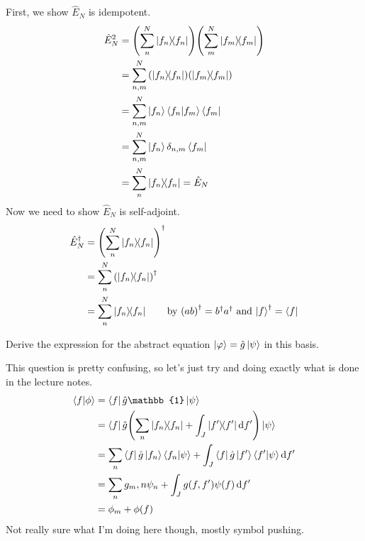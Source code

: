 \documentclass[boxes,pages]{homework}
\makeatletter
\newcommand{\herm}[1]{{{#1}^\dagger}}
\numberwithin{@problem}{section}
\makeatother
\begin{document}
\begin{solution}
	First, we show $\hat{E}_N$ is idempotent.
	\begin{align*}
		\hat{E}_N^2 & = \qty(\sum_n^N\ketbra{f_n}{f_n})\qty(\sum_m^N\ketbra{f_m}{f_m}) \\
		            & = \sum_{n, m}^N\qty(\ketbra{f_n}{f_n})\qty(\ketbra{f_m}{f_m})    \\
		            & = \sum_{n, m}^N\ket{f_n}\braket{f_n}{f_m}\bra{f_m}               \\
		            & = \sum_{n, m}^N\ket{f_n}\delta_{n,m}\bra{f_m}                    \\
		            & = \sum_n^N\ketbra{f_n}{f_n} = \hat{E}_N
	\end{align*}
	Now we need to show $\hat{E}_N$ is self-adjoint.
	\begin{align*}
		\herm{\hat{E}_N} & = \herm{\qty(\sum_n^N\ketbra{f_n}{f_n})}                                                                  \\
		                 & = \sum_n^N\herm{\qty(\ketbra{f_n}{f_n})}                                                                  \\
		                 & = \sum_n^N\ketbra{f_n}{f_n} \tag*{by $\herm{\qty(ab)} = \herm{b}\herm{a}$ and $\herm{\ket{f}} = \bra{f}$}
	\end{align*}
\end{solution}

\begin{problem}
Derive the expression for the abstract equation $\ket{\varphi} = \hat{g}\ket{\psi}$ in this basis.
\end{problem}

\begin{solution}
	This question is pretty confusing, so let's just try and doing exactly what is done in the lecture notes.
	\begin{align*}
		\braket{f}{\phi} & = \bra{f}\hat{g}\mathbb{1}\ket{\psi}                                                                     \\
		                 & = \bra{f}\hat{g}\qty(\sum_n\ketbra{f_n}{f_n} + \int_J\ketbra{f'}{f'}\dd{f'})\ket{\psi}                   \\
		                 & = \sum_n\bra{f}\hat{g}\ket{f_n}\braket{f_n}{\psi} + \int_J\bra{f}\hat{g}\ket{f'}\braket{f'}{\psi}\dd{f'} \\
		                 & = \sum_n g_m,n\psi_n + \int_J g(f, f')\psi(f)\dd{f'}                                                     \\
		                 & = \phi_m + \phi(f)
	\end{align*}
	Not really sure what I'm doing here though, mostly symbol pushing.
\end{solution}
\end{document}
